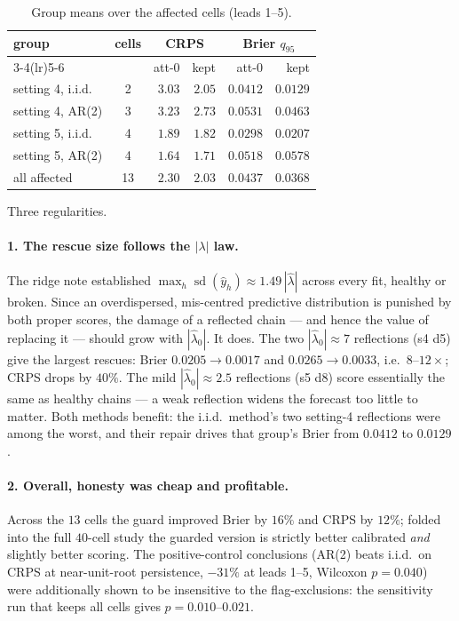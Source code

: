 \documentclass[11pt]{article}
\DeclareMathOperator{\sd}{sd}
\begin{document}
\begin{table}[ht]
\centering
\caption{Group means over the affected cells (leads 1--5).}
\label{tab:groups}
\begin{tabular}{lcrrrr}
\toprule
group & cells & \multicolumn{2}{c}{CRPS} & \multicolumn{2}{c}{Brier $q_{95}$} \\
\cmidrule(lr){3-4}\cmidrule(lr){5-6}
 & & att-0 & kept & att-0 & kept \\
\midrule
setting 4, i.i.d. & 2 & $3.03$ & $2.05$ & $0.0412$ & $0.0129$ \\
setting 4, AR(2)  & 3 & $3.23$ & $2.73$ & $0.0531$ & $0.0463$ \\
setting 5, i.i.d. & 4 & $1.89$ & $1.82$ & $0.0298$ & $0.0207$ \\
setting 5, AR(2)  & 4 & $1.64$ & $1.71$ & $0.0518$ & $0.0578$ \\
\midrule
all affected      & 13 & $2.30$ & $2.03$ & $0.0437$ & $0.0368$ \\
\bottomrule
\end{tabular}
\end{table}

Three regularities.

\paragraph{1. The rescue size follows the $|\lambda|$ law.} The ridge note
established $\max_h \sd(\hat y_h) \approx 1.49\,|\hat\lambda|$ across every
fit, healthy or broken. Since an overdispersed, mis-centred predictive
distribution is punished by both proper scores, the damage of a reflected
chain --- and hence the value of replacing it --- should grow with
$|\hat\lambda_0|$. It does. The two $|\hat\lambda_0| \approx 7$ reflections
(s4 d5) give the largest rescues: Brier $0.0205 \to 0.0017$ and
$0.0265 \to 0.0033$, i.e.\ $8$--$12\times$; CRPS drops by $40\%$. The mild
$|\hat\lambda_0| \approx 2.5$ reflections (s5 d8) score essentially the same
as healthy chains --- a weak reflection widens the forecast too little to
matter. Both methods benefit: the i.i.d.\ method's two setting-4 reflections
were among the worst, and their repair drives that group's Brier from
$0.0412$ to $0.0129$.

\paragraph{2. Overall, honesty was cheap and profitable.} Across the $13$
cells the guard improved Brier by $16\%$ and CRPS by $12\%$; folded into the
full $40$-cell study the guarded version is strictly better calibrated
\emph{and} slightly better scoring. The positive-control conclusions
(AR(2) beats i.i.d.\ on CRPS at near-unit-root persistence, $-31\%$ at leads
1--5, Wilcoxon $p = 0.040$) were additionally shown to be insensitive to the
flag-exclusions: the sensitivity run that keeps all cells gives
$p = 0.010$--$0.021$.
\end{document}
